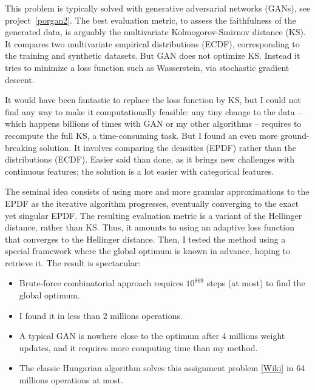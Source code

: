 \documentclass[oneside,10pt]{book}
\begin{document}
This problem is typically solved with generative adversarial networks (\textcolor{index}{GANs}),
 see project~\ref{porgan2}. The best evaluation metric, to assess the faithfulness of the generated data,
 is arguably the 
\textcolor{index}{multivariate Kolmogorov-Smirnov distance} (KS). 
It compares two multivariate empirical distributions 
(\textcolor{index}{ECDF}), corresponding to  the training and synthetic datasets. But GAN does not optimize KS. Instead it tries to minimize a loss function such as 
\textcolor{index}{Wasserstein}, via 
\textcolor{index}{stochastic gradient descent}. 

It would have been fantastic to replace the loss function by KS, but I could not find any way to make it computationally feasible: any tiny
 change to the data -- which happens billions of times with GAN or my other algorithms -- requires to recompute the full KS, a time-consuming task. 
But I found an even more ground-breaking solution. It involves comparing the densities 
(\textcolor{index}{EPDF}) rather than 
the distributions (\textcolor{index}{ECDF}). Easier said than done, as it brings new challenges with continuous features; the solution is a lot easier 
 with categorical features.

The seminal idea consists of using more and more granular approximations to the EPDF as the iterative algorithm progresses, eventually converging to the exact yet
 singular EPDF.  The resulting evaluation metric is a variant of the 
\textcolor{index}{Hellinger distance}, rather than KS. Thus, it amounts to using an 
\textcolor{index}{adaptive loss function}~\cite{adaloss} that converges to the Hellinger distance. 
Then, I tested the method using a special framework where the global optimum is known in advance, hoping to retrieve it. The result is spectacular: 
\vspace{1ex}
\begin{itemize}
\item Brute-force combinatorial approach
 requires $10^{869}$ steps (at most) to find the global optimum. 
\item I found it in less than 2 millions operations. 
\item A typical GAN is nowhere close to the
 optimum after 4 millions weight updates, and it requires more computing time than my method. 
\item The classic \textcolor{index}{Hungarian algorithm} solves this assignment problem [\href{https://en.wikipedia.org/wiki/Assignment_problem}{Wiki}] in 64 millions operations at most. 
\end{itemize}
\vspace{1ex}
\end{document}
